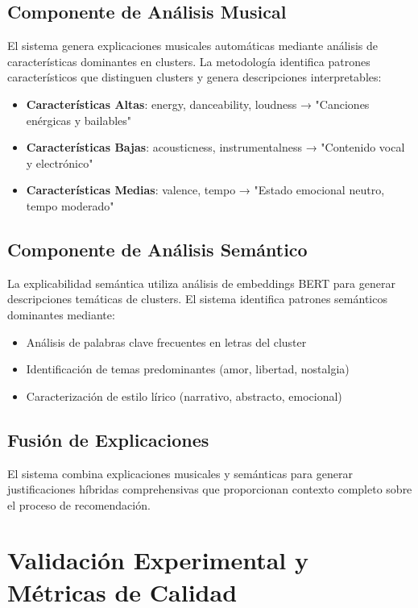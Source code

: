 \documentclass[12pt,a4paper]{report}
\begin{document}
\subsection{Componente de Análisis Musical}

El sistema genera explicaciones musicales automáticas mediante análisis de características dominantes en clusters. La metodología identifica patrones característicos que distinguen clusters y genera descripciones interpretables:

\begin{itemize}
\item \textbf{Características Altas}: energy, danceability, loudness → "Canciones enérgicas y bailables"
\item \textbf{Características Bajas}: acousticness, instrumentalness → "Contenido vocal y electrónico"
\item \textbf{Características Medias}: valence, tempo → "Estado emocional neutro, tempo moderado"
\end{itemize}

\subsection{Componente de Análisis Semántico}

La explicabilidad semántica utiliza análisis de embeddings BERT para generar descripciones temáticas de clusters. El sistema identifica patrones semánticos dominantes mediante:

\begin{itemize}
\item Análisis de palabras clave frecuentes en letras del cluster
\item Identificación de temas predominantes (amor, libertad, nostalgia)
\item Caracterización de estilo lírico (narrativo, abstracto, emocional)
\end{itemize}

\subsection{Fusión de Explicaciones}

El sistema combina explicaciones musicales y semánticas para generar justificaciones híbridas comprehensivas que proporcionan contexto completo sobre el proceso de recomendación.

\section{Validación Experimental y Métricas de Calidad}
\end{document}
